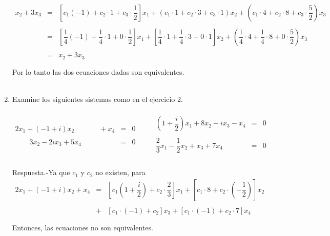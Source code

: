 \begin{enumerate}[\bfseries 1.]
	$$\begin{array}{rcl}
	    x_2+3x_3 &=& \left[c_1(-1)+c_2\cdot 1 + c_3\cdot \dfrac{1}{2}\right]x_1+(c_1\cdot 1 + c_2\cdot 3 + c_3\cdot 1)x_2+\left(c_1 \cdot 4+c_2\cdot 8 + c_3\cdot \dfrac{5}{2}\right)x_3\\\\
	    		    &=& \left[\dfrac{1}{4}(-1)+\dfrac{1}{4}\cdot 1 + 0\cdot \dfrac{1}{2}\right]x_1+\left[\dfrac{1}{4}\cdot 1 + \dfrac{1}{4}\cdot 3 + 0\cdot 1\right]x_2+\left(\dfrac{1}{4} \cdot 4+\dfrac{1}{4}\cdot 8 + 0\cdot \dfrac{5}{2}\right)x_3\\\\
			    &=&x_2+3x_3\\\\
	\end{array}$$ 
	Por lo tanto las dos ecuaciones dadas son equivalentes.\\\\


    \item Examine los siguientes sistemas como en el ejercicio 2.\\\\
    $$\begin{array}{rcl}
	2x_1+(-1+i)x_2 \qquad \quad\;\, + x_4 &=& 0\\\\
	\qquad 3x_2-2ix_3+5x_4 &=& 0\\
    \end{array}\qquad 
    \begin{array}{rcl}
	\left(1+\dfrac{i}{2}\right)x_1+8x_2-ix_3-x_4&=&0\\\\
	\dfrac{2}{3}x_1-\dfrac{1}{2}x_2+x_3+7x_4&=&0\\\\
    \end{array}$$ 
    \vspace{0.4cm}

	Respuesta.-\;Ya que  $c_1$ y $c_2$ no existen, para
	$$\begin{array}{rcl}
	    2x_1+(-1+i)x_2 + x_4 &=& \left[c_1\left(1+\dfrac{i}{2}\right)+c_2\cdot\dfrac{2}{3}\right]x_1 +  \left[c_1\cdot 8+c_2\cdot\left(-\dfrac{1}{2}\right)\right]x_2 \\\\
				 &+& \left[c_1\cdot (-1)+c_2\right]x_3 + \left[c_1\cdot (-1)+c_2\cdot 7\right]x_4\\\\
	\end{array}$$
	Entonces, las ecuaciones no son equivalentes.\\\\


\end{enumerate}
